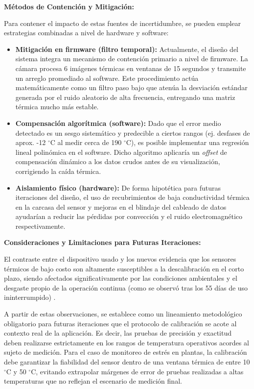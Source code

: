 \textbf{Métodos de Contención y Mitigación:}

Para contener el impacto de estas fuentes de incertidumbre, se pueden emplear estrategias combinadas a nivel de hardware y software:

\begin{itemize}
    \item \textbf{Mitigación en firmware (filtro temporal):} Actualmente, el diseño del sistema integra un mecanismo de contención primario a nivel de firmware. La cámara procesa 6 imágenes térmicas en ventanas de 15 segundos y transmite un arreglo promediado al software. Este procedimiento actúa matemáticamente como un filtro paso bajo que atenúa la desviación estándar generada por el ruido aleatorio de alta frecuencia, entregando una matriz térmica mucho más estable.
    \item \textbf{Compensación algorítmica (software):} Dado que el error medio detectado es un sesgo sistemático y predecible a ciertos rangos (ej. desfases de aprox. -12 $^\circ$C al medir cerca de 190 $^\circ$C), es posible implementar una regresión lineal polinómica en el software. Dicho algoritmo aplicaría un \textit{offset} de compensación dinámico a los datos crudos antes de su visualización, corrigiendo la caída térmica.
    \item \textbf{Aislamiento físico (hardware):} De forma hipotética para futuras iteraciones del diseño, el uso de recubrimientos de baja conductividad térmica en la carcasa del sensor y mejoras en el blindaje del cableado de datos ayudarían a reducir las pérdidas por convección y el ruido electromagnético respectivamente.
\end{itemize}

\textbf{Consideraciones y Limitaciones para Futuras Iteraciones:}

El contraste entre el dispositivo usado y los nuevos evidencia que los sensores térmicos de bajo costo son altamente susceptibles a la descalibración en el corto plazo, siendo afectados significativamente por las condiciones ambientales y el desgaste propio de la operación continua (como se observó tras los 55 días de uso ininterrumpido) .

A partir de estas observaciones, se establece como un lineamiento metodológico obligatorio para futuras iteraciones que el protocolo de calibración se acote al contexto real de la aplicación. Es decir, las pruebas de precisión y exactitud deben realizarse estrictamente en los rangos de temperatura operativos acordes al sujeto de medición. Para el caso de monitoreo de estrés en plantas, la calibración debe garantizar la fiabilidad del sensor dentro de una ventana térmica de entre 10 $^\circ$C y 50 $^\circ$C, evitando extrapolar márgenes de error de pruebas realizadas a altas temperaturas que no reflejan el escenario de medición final.

